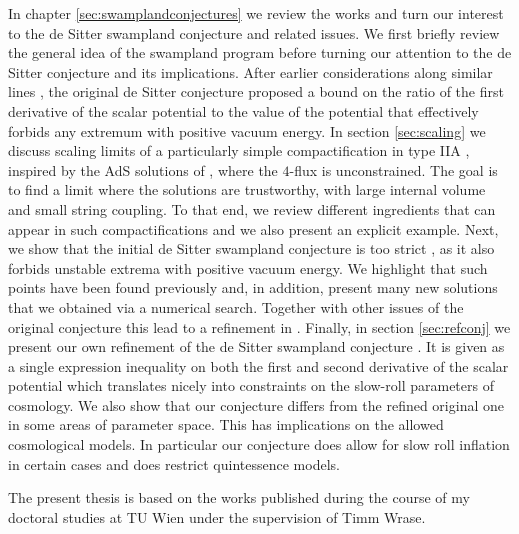 \documentclass[a4paper,12pt]{report}
\begin{document}
In chapter \ref{sec:swamplandconjectures} we review the works \cite{Roupec:2018mbn,Banlaki:2018ayh,Andriot:2018mav} and turn our interest to the de Sitter swampland conjecture \cite{Obied:2018sgi} and related issues. We first briefly review the general idea of the swampland program \cite{Brennan:2017rbf,Palti:2019pca,vanBeest:2021lhn} before turning our attention to the de Sitter conjecture \cite{Obied:2018sgi,Ooguri:2018wrx} and its implications. After earlier considerations along similar lines \cite{Danielsson:2018ztv}, the original de Sitter conjecture \cite{Obied:2018sgi} proposed a bound on the ratio of the first derivative of the scalar potential to the value of the potential that effectively forbids any extremum with positive vacuum energy. In section \ref{sec:scaling} we discuss scaling limits of a particularly simple compactification in type IIA \cite{Banlaki:2018ayh}, inspired by the AdS solutions of \cite{DeWolfe:2005uu}, where the $4$-flux is unconstrained. The goal is to find a limit where the solutions are trustworthy, with large internal volume and small string coupling. To that end, we review different ingredients that can appear in such compactifications and we also present an explicit example. Next, we show that the initial de Sitter swampland conjecture is too strict \cite{Roupec:2018mbn}, as it also forbids unstable extrema with positive vacuum energy. We highlight that such points have been found previously \cite{Caviezel:2008tf,Flauger:2008ad} and, in addition, present many new solutions that we obtained via a numerical search. Together with other issues of the original conjecture \cite{Denef:2018etk} this lead to a refinement in \cite{Ooguri:2018wrx}. Finally, in section \ref{sec:refconj} we present our own refinement of the de Sitter swampland conjecture \cite{Andriot:2018mav}. It is given as a single expression inequality on both the first and second derivative of the scalar potential which translates nicely into constraints on the slow-roll parameters of cosmology. We also show that our conjecture differs from the refined original one \cite{Ooguri:2018wrx} in some areas of parameter space. This has implications on the allowed cosmological models. In particular our conjecture does allow for slow roll inflation in certain cases and does restrict quintessence models.

\vspace{12pt}
The present thesis is based on the works \cite{Roupec:2018mbn,Banlaki:2018ayh,Andriot:2018mav,Cribiori:2019hod,Cribiori:2019bfx,Cribiori:2019drf,Cribiori:2019hrb,Cribiori:2020bgt} published during the course of my doctoral studies at TU Wien under the supervision of Timm Wrase.
\end{document}
